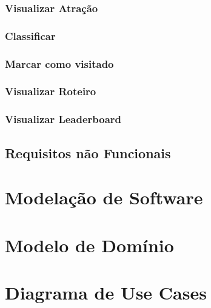 \documentclass[
  oneside,
  11pt, a4paper,
  footinclude=true,
  headinclude=true,
  cleardoublepage=empty
]{scrbook}
\begin{document}
        \subsubsection{Visualizar Atração}
        
        
        \subsubsection{Classificar}
        
        
        \subsubsection{Marcar como visitado}
        
        
        \subsubsection{Visualizar Roteiro}
        
        
        \subsubsection{Visualizar Leaderboard}
        
        
        \subsection{Requisitos não Funcionais}
        
    
    	\section{Modelação de Software}
	
	
	\newpage
	
    \section{Modelo de Domínio}
    
    
    \newpage
    
    \section{Diagrama de Use Cases}
    
    
\end{document}
